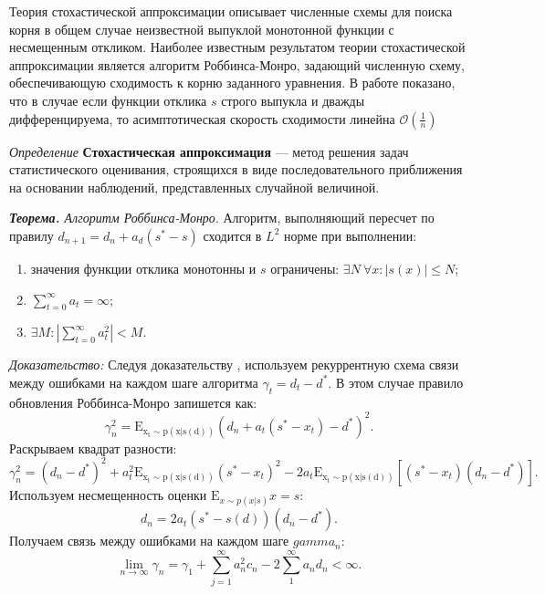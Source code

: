 Теория стохастической аппроксимации описывает численные схемы для поиска корня в общем случае неизвестной выпуклой монотонной
функции с несмещенным откликом. Наиболее известным результатом теории стохастической аппроксимации является алгоритм
Роббинса-Монро, задающий численную схему, обеспечивающую сходимость к корню заданного уравнения. В работе \cite{sacks1958asymptotic} показано, что в случае если функции отклика $s$ 
строго выпукла и дважды дифференцируема, то асимптотическая скорость сходимости линейна $\mathcal{O}(\frac{1}{n})$ 

\textit{Определение} \textbf{Стохастическая аппроксимация} --- метод решения задач статистического оценивания,
строящихся в виде последовательного приближения на основании наблюдений, представленных случайной величиной.

\textit{\textbf{Теорема.} Алгоритм Роббинса-Монро}. Алгоритм, выполняющий пересчет по 
правилу $d_{n+1} =d _n + a_d(s^*-s)$ сходится в $L^2$ норме при выполнении:
 \begin{enumerate}
    \item значения функции отклика монотонны и $s$ ограничены: $\exists N\ \forall x : | s(x) | \le N$;
    \item $\sum_{t=0}^\infty a_t = \infty$;
    \item $\exists M : |\sum_{t=0}^\infty a_t^2 |< M$.
\end{enumerate}
\textit{Доказательство:} \label{monro}
Следуя доказательству \cite{blum1954approximation}, используем рекуррентную схема связи между ошибками 
на каждом шаге алгоритма $\gamma_t = d_t - d^*$. 
В этом случае правило обновления Роббинса-Монро запишется как: 
\begin{equation}
    \gamma_n^2 = \mathrm{E_{x_t \sim p(x|s(d))}}(d_n+a_t(s^*-x_t) -d^*)^2.
\end{equation}
Раскрываем квадрат разности:
\begin{equation}
    \gamma_n^2 = (d_n - d^*)^2 + a_t^2 \mathrm{E_{x_t \sim p(x|s(d))}} (s^*-x_t)^2 - 2 a_t \mathrm{E_{x_t \sim p(x|s(d))}}\left[ (s^*-x_t)(d_n-d^*) \right].
\end{equation}
Используем несмещенность оценки $\mathrm{E}_{x \sim p(x|s)} x = s$:
\begin{equation}
    d_n =2 a_t (s^* -s(d))(d_n-d^*).
\end{equation}
Получаем связь между ошибками на каждом шаге $gamma_n$:
\begin{equation}
    \lim_{n \rightarrow \infty} \gamma_n = \gamma_1 + \sum_{j=1}^\infty a_n^2 c_n -2 \sum_1^{\infty} a_n d_n < \infty.
\end{equation}
